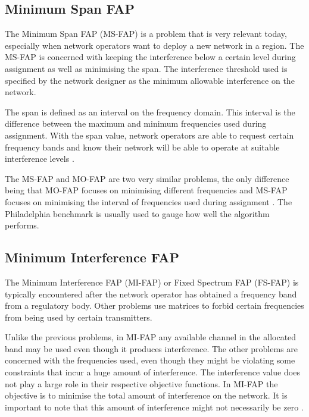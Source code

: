 \subsection{Minimum Span FAP}
The Minimum Span FAP (MS-FAP) is a problem that is very relevant today, especially when network operators want to deploy a new network in a region\cite{Karen2004}. The MS-FAP is concerned with keeping the interference below a certain level during assignment as well as minimising the span\cite{MSFAP}. The interference threshold used is specified by the network designer as the minimum allowable interference on the network\cite{MSFAP}.

The span is defined as an interval on the frequency domain. This interval is the difference between the maximum and minimum frequencies used during assignment\cite{Karen2004,MSFAP}. With the span value, network operators are able to request certain frequency bands and know their network will be able to operate at suitable interference levels \cite{Karen2004,MSFAP}.

The MS-FAP and MO-FAP are two very similar problems, the only difference being that MO-FAP focuses on minimising different frequencies and MS-FAP focuses on minimising the interval of frequencies used during assignment \cite{Karen2004}. The Philadelphia benchmark is usually used to gauge how well the algorithm performs.
\subsection{Minimum Interference FAP}
The Minimum Interference FAP (MI-FAP) or Fixed Spectrum FAP (FS-FAP) is typically encountered after the network operator has obtained a frequency band from a regulatory body\cite{Karen2004}. Other problems use matrices to forbid certain frequencies from being used by certain transmitters\cite{MontemanniThesis}. 

Unlike the previous problems, in MI-FAP any available channel in the allocated band may be used even though it produces interference. The other problems are concerned with the frequencies used, even though they might be violating some constraints that incur a huge amount of interference\cite{MontemanniThesis,MultipleBinaryFAP}. The interference value does not play a large role in their respective objective functions\cite{Eisenblatter,MultipleBinaryFAP}. In MI-FAP the objective is to minimise the total amount of interference on the network. It is important to note that this amount of interference might not necessarily be zero \cite{Karen2004,Eisenblatter}.

